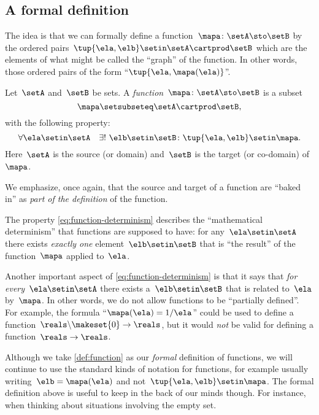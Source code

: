 \subsection{A formal definition}

The idea is that we can formally define a function~$\mapa\colon \setA \sto \setB$ by the ordered pairs~$\tup{\ela, \elb} \setin\setA \cartprod \setB$ which are the elements of what might be called the ``graph'' of the function.
In other words, those ordered pairs of the form ``$\tup{\ela, \mapa(\ela)}$''.

\begin{ctdefinition}[Function]
    \label{def:function}
    Let~$\setA$ and~$\setB$ be sets.
    A \emph{function}~$\mapa\colon \setA \sto \setB$ is a subset
    \begin{equation}
        \mapa \setsubseteq \setA \cartprod \setB,
    \end{equation}
    with the following property:
    \begin{equation}
        \label{eq:function-determinism}
        \forall \ela \setin\setA  \quad  \exists !
        \ \elb \setin\setB \colon \tup{\ela,\elb} \setin\mapa.
    \end{equation}
    Here~$\setA$ is the source (or domain) and~$\setB$ is the target (or co-domain) of~$\mapa$.
\end{ctdefinition}

We emphasize, once again, that the source and target of a function are ``baked in'' as \emph{part of the definition} of the function.

The property \cref{eq:function-determinism} describes the ``mathematical determinism'' that functions are supposed to have: for any~$\ela \setin\setA$ there exists \emph{exactly one} element~$\elb \setin\setB$ that is ``the result'' of the function~$\mapa$ applied to~$\ela$.

Another important aspect of \cref{eq:function-determinism} is that it says that \emph{for every}~$\ela \setin\setA$ there exists a~$\elb \setin\setB$ that is related to~$\ela$ by~$\mapa$.
In other words, we do not allow functions to be ``partially defined''.
For example, the formula ``$\mapa(\ela) = 1/ \ela$'' could be used to define a function~$\reals \backslash \makeset{ 0 } \to \reals$, but it would \emph{not} be valid for defining a function~$\reals \to \reals$.

Although we take \cref{def:function} as our \emph{formal} definition of functions, we will continue to use the standard kinds of notation for functions, for example usually writing~$\elb = \mapa(\ela)$ and not~$\tup{\ela, \elb} \setin\mapa$.
The formal definition above is useful to keep in the back of our minds though.
For instance, when thinking about situations involving the empty set.


